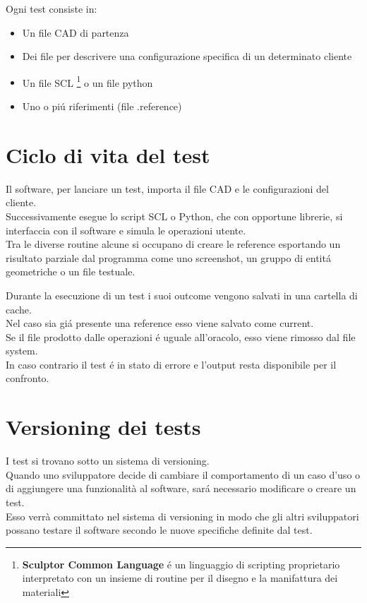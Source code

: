         Ogni test consiste in:
        \begin{itemize}
            \item Un file CAD di partenza
            \item Dei file per descrivere una configurazione specifica di un determinato cliente
            \item Un file SCL \footnote{\textbf{Sculptor Common Language} \'e un linguaggio di scripting proprietario interpretato con un insieme di routine per il disegno e la manifattura dei materiali} o un file python
            \item Uno o pi\'u riferimenti (file .reference)
        \end{itemize}

    \section{Ciclo di vita del test}
        Il software, per lanciare un test, importa il file CAD e le configurazioni del cliente.\\
        Successivamente esegue lo script SCL o Python, che con opportune librerie, si interfaccia con il software
        e simula le operazioni utente. \\
        
        Tra le diverse routine alcune si occupano di creare le reference esportando un risultato parziale dal programma come uno screenshot, un gruppo di entit\'a geometriche o un file testuale.

        Durante la esecuzione di un test i suoi outcome vengono salvati in una cartella di cache.\\
        Nel caso sia gi\'a presente una reference esso viene salvato come current.\\

        Se il file prodotto dalle operazioni \'e uguale all'oracolo, esso viene rimosso dal file system.\\
        In caso contrario il test \'e in stato di errore e l'output resta disponibile per il confronto.\\

    \section{Versioning dei tests}
            I test si trovano sotto un sistema di versioning.\\
            Quando uno sviluppatore decide di cambiare il comportamento di un caso d'uso o di aggiungere una funzionalità al software,
            sar\'a necessario modificare o creare un test.\\
            Esso verrà committato nel sistema di versioning in modo che gli altri sviluppatori possano testare il software secondo le nuove specifiche definite dal test.    

